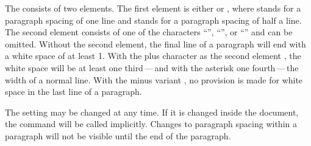 \begin{Declaration}
\end{Declaration}
The  consists of two elements. The first element is either
 or , where  stands
for a paragraph spacing of one line and  stands for a paragraph
spacing of half a line. The second element consists of one of the characters
``\PValue{*}'', ``\PValue{+}'', or ``\PValue{-}'' and can be omitted. Without
the second element, the final line
of a paragraph will end with a white space of at least 1. With the
plus character as the second element%
, the white space will be
at least one third\,---\,and with the
asterisk one
fourth\,---\,the width of a normal line. With the minus variant%
, no provision is made for
white space in the last line of a paragraph.

The setting may be changed at any time. If it is changed inside the document,
the %
command will be called implicitly. Changes to paragraph spacing within a 
paragraph will not be visible until the end of the paragraph.

